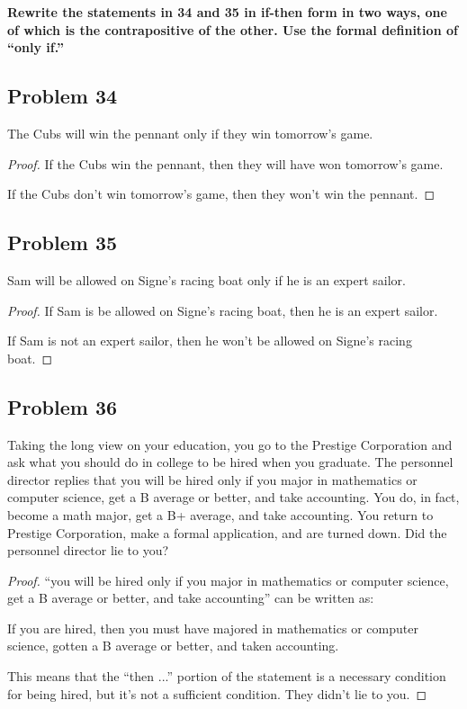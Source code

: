 \documentclass[14pt]{extarticle}
\begin{document}
{\bf Rewrite the statements in 34 and 35 in if-then form in two ways, one of
which is the contrapositive of the other. Use the formal definition of “only
if.”}

\subsection{Problem 34}
The Cubs will win the pennant only if they win tomorrow’s game.

\begin{proof}
If the Cubs win the pennant, then they will have won tomorrow’s game.

If the Cubs don't win tomorrow's game, then they won't win the pennant.
\end{proof}

\subsection{Problem 35}
Sam will be allowed on Signe’s racing boat only if he is an expert sailor.

\begin{proof}
If Sam is be allowed on Signe’s racing boat, then he is an expert sailor.

If Sam is not an expert sailor, then he won't be allowed on Signe’s racing boat.\end{proof}

\subsection{Problem 36}
Taking the long view on your education, you go to the Prestige Corporation and
ask what you should do in college to be hired when you graduate. The personnel
director replies that you will be hired only if you major in mathematics or
computer science, get a B average or better, and take accounting. You do, in
fact, become a math major, get a B+ average, and take accounting. You return to
Prestige Corporation, make a formal application, and are turned down. Did the
personnel director lie to you?

\begin{proof}
``you will be hired only if you major in mathematics or computer science, get a
B average or better, and take accounting'' can be written as:

If you are hired, then you must have majored in mathematics or computer science,
gotten a B average or better, and taken accounting.

This means that the ``then ...'' portion of the statement is a necessary
condition for being hired, but it's not a sufficient condition. They didn't lie
to you.
\end{proof}
\end{document}
